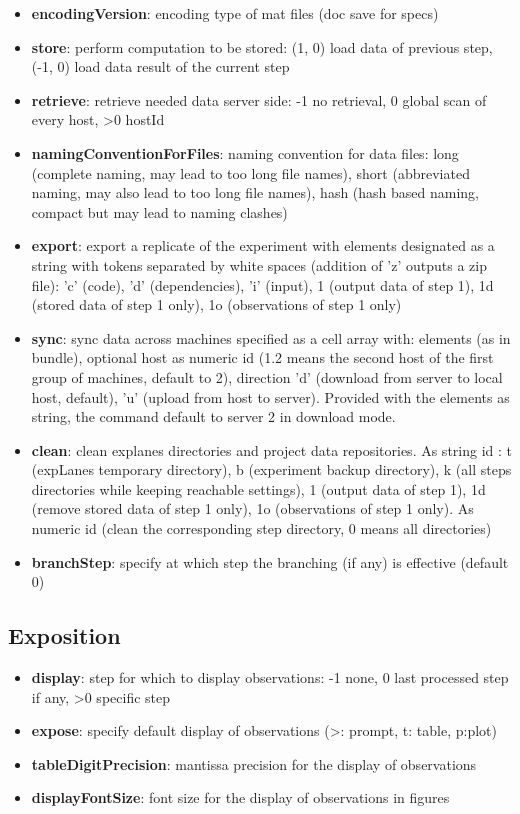 \documentclass[a4paper,fleqn]{tufte-handout}
\begin{document}
\begin{itemize}
\item \textbf{encodingVersion}: encoding type of mat files (doc save for specs)
\item \textbf{store}: perform computation to be stored: (1, 0) load data of previous step, (-1, 0) load data result of the current step
\item \textbf{retrieve}: retrieve needed data server side: -1 no retrieval, 0 global scan of every host, >0 hostId
\item \textbf{namingConventionForFiles}: naming convention for data files: long (complete naming, may lead to too long file names), short (abbreviated naming, may also lead to too long file names), hash (hash based naming, compact but may lead to naming clashes)
\item \textbf{export}: export a replicate of the experiment with elements designated as a string with tokens separated by white spaces (addition of 'z' outputs a zip file): 'c' (code), 'd' (dependencies), 'i' (input), 1 (output data of step 1), 1d (stored data of step 1 only), 1o (observations of step 1 only) 
\item \textbf{sync}: sync data across machines specified as a cell array with: elements (as in bundle), optional host as numeric id (1.2 means the second host of the first group of machines, default to 2), direction 'd' (download from server to local host, default), 'u' (upload from host to server). Provided with the elements as string, the command default to server 2 in download mode.
\item \textbf{clean}: clean explanes directories and project data repositories. As string id : t (expLanes temporary directory), b (experiment backup directory), k (all steps directories while keeping reachable settings), 1 (output data of step 1), 1d (remove stored data of step 1 only), 1o (observations of step 1 only). As numeric id (clean the corresponding step directory, 0 means all directories) 
\item \textbf{branchStep}:  specify at which step the branching (if any) is effective (default 0)
\end{itemize}

\subsection{Exposition}

\begin{itemize}
\item \textbf{display}: step for which to display observations: -1 none, 0 last processed step if any, >0 specific step
\item \textbf{expose}: specify default display of observations (>: prompt, t: table, p:plot)
\item \textbf{tableDigitPrecision}: mantissa precision for the display of observations
\item \textbf{displayFontSize}: font size for the display of observations in figures
\end{itemize}
\end{document}
